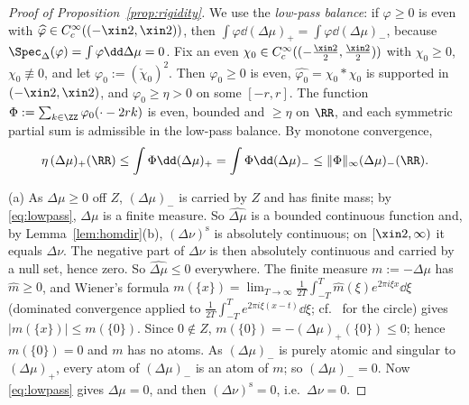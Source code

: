 \begin{proof}[Proof of Proposition~\textup{\ref{prop:rigidity}}]
We use the \emph{low-pass balance}: if $\varphi\ge0$ is even with $\widehat\varphi\in C_c^\infty((-\xin2,\xin2))$, then
$\int\varphi\dd(\Delta\mu)_+=\int\varphi\dd(\Delta\mu)_-$, because $\Spec_\Delta(\varphi)=\int\varphi\dd\Delta\mu=0$. Fix an even
$\chi_0\in C_c^\infty((-\frac{\xin2}2,\frac{\xin2}2))$ with $\chi_0\ge0$, $\chi_0\not\equiv0$, and let $\varphi_0:=(\check\chi_0)^2$.
Then $\varphi_0\ge0$ is even, $\widehat{\varphi_0}=\chi_0*\chi_0$ is supported in $(-\xin2,\xin2)$, and $\varphi_0\ge\eta>0$ on
some $[-r,r]$. The function $\Phi:=\sum_{k\in\ZZ}\varphi_0(\cdot-2rk)$ is even, bounded and $\ge\eta$ on $\RR$, and each
symmetric partial sum is admissible in the low-pass balance. By monotone convergence,
\begin{equation}\label{eq:lowpass}
\eta\,(\Delta\mu)_+(\RR)\le\int\Phi\dd(\Delta\mu)_+=\int\Phi\dd(\Delta\mu)_-\le\|\Phi\|_\infty(\Delta\mu)_-(\RR).
\end{equation}

(a) As $\Delta\mu\ge0$ off $Z$, $(\Delta\mu)_-$ is carried by $Z$ and has finite mass; by \eqref{eq:lowpass}, $\Delta\mu$ is a finite
measure. So $\widehat{\Delta\mu}$ is a bounded continuous function and, by Lemma~\ref{lem:homdir}(b), $(\Delta\nu)^{\mathrm s}$ is
absolutely continuous; on $[\xin2,\infty)$ it equals $\Delta\nu$. The negative part of $\Delta\nu$ is then absolutely continuous and
carried by a null set, hence zero. So $\widehat{\Delta\mu}\le0$ everywhere. The finite measure $m:=-\Delta\mu$ has $\widehat m\ge0$,
and Wiener's formula $m(\{x\})=\lim_{T\to\infty}\frac1{2T}\int_{-T}^{T}\widehat m(\xi)e^{2\pi i\xi x}\dd\xi$ (dominated convergence
applied to $\frac1{2T}\int_{-T}^Te^{2\pi i\xi(x-t)}\dd\xi$; cf.\ \cite[I.7.13]{Kat04} for the circle) gives $|m(\{x\})|\le m(\{0\})$. Since $0\notin Z$, $m(\{0\})=-(\Delta\mu)_+(\{0\})\le0$; hence
$m(\{0\})=0$ and $m$ has no atoms. As $(\Delta\mu)_-$ is purely atomic and singular to $(\Delta\mu)_+$, every atom of $(\Delta\mu)_-$
is an atom of $m$; so $(\Delta\mu)_-=0$. Now \eqref{eq:lowpass} gives $\Delta\mu=0$, and then $(\Delta\nu)^{\mathrm s}=0$, i.e.\ $\Delta\nu=0$.


\end{proof}
